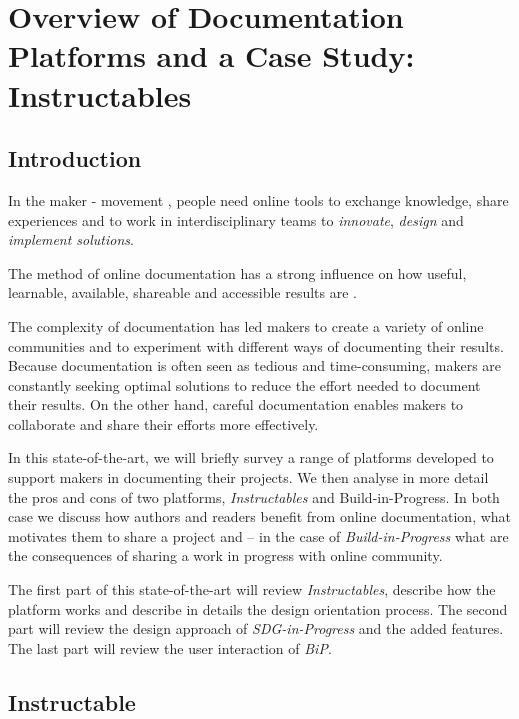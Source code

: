 
\chapter{Overview of Documentation Platforms  and a Case Study: Instructables}
\section{Introduction}
In the maker - movement \cite{davies2017hackerspaces}, people need online tools to exchange knowledge, share experiences and to work in interdisciplinary teams to \textit{innovate}, \textit{design} and \textit{implement solutions}.

The method of online documentation has a strong influence on how useful, learnable, available, shareable and accessible results are \cite{harcourt2016re}.

The complexity of documentation has led makers to create a variety of online communities and to experiment with different ways of documenting their results. Because documentation is often seen as tedious and time-consuming, makers are constantly seeking optimal solutions to reduce the effort needed to document their results. On the other hand, careful documentation enables makers to collaborate and share their efforts more effectively.


In this state-of-the-art, we will briefly survey a range of platforms developed to support makers in documenting their projects. We then analyse in more detail the pros and cons of two platforms, \textit{Instructables} and Build-in-Progress. In both case we discuss how authors and readers benefit from online documentation, what motivates them to share a project and – in the case of \textit{Build-in-Progress} what are the consequences of sharing a work in progress with online community.

The first part of this state-of-the-art will review \textit{Instructables}, describe how the platform works and describe in details the design orientation process. The second part will review the design approach of \textit{SDG-in-Progress} and the added features. The last part will review the user interaction of \textit{BiP}. 



\section{Instructable}


